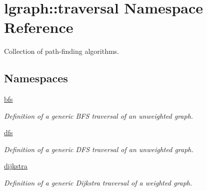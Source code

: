 \hypertarget{namespacelgraph_1_1traversal}{\section{lgraph\-:\-:traversal Namespace Reference}
\label{namespacelgraph_1_1traversal}
}


Collection of path-\/finding algorithms.  


\subsection*{Namespaces}
\begin{DoxyCompactItemize}
\item 
\hyperlink{namespacelgraph_1_1traversal_1_1bfs}{bfs}
\begin{DoxyCompactList}\small\item\em Definition of a generic B\-F\-S traversal of an unweighted graph. \end{DoxyCompactList}\item 
\hyperlink{namespacelgraph_1_1traversal_1_1dfs}{dfs}
\begin{DoxyCompactList}\small\item\em Definition of a generic D\-F\-S traversal of an unweighted graph. \end{DoxyCompactList}\item 
\hyperlink{namespacelgraph_1_1traversal_1_1dijkstra}{dijkstra}
\begin{DoxyCompactList}\small\item\em Definition of a generic Dijkstra traversal of a weighted graph. \end{DoxyCompactList}\end{DoxyCompactItemize}
